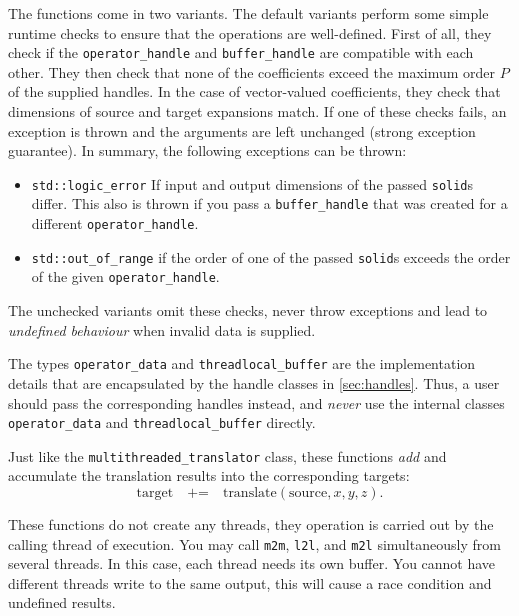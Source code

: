 \documentclass{scrbook}
\begin{document}
The functions come in two variants. The default variants perform some simple
runtime checks to ensure that the operations are well-defined. First of all,
they check if the \lstinline|operator_handle| and \lstinline|buffer_handle| are
compatible with each other. They then check that none of the coefficients
exceed the maximum order $P$ of the supplied handles. In the case of
vector-valued coefficients, they check that dimensions of source and target
expansions match. If one of these checks fails, an exception is thrown and the
arguments are left unchanged (strong exception guarantee). In summary, the
following exceptions can be thrown:
\begin{itemize}
\item \lstinline|std::logic_error| If input and output dimensions of the passed
\lstinline|solid|s differ. This also is thrown if you pass a
\lstinline|buffer_handle| that was created for a different
\lstinline|operator_handle|.
\item \lstinline|std::out_of_range| if the order of one of the passed
\lstinline|solid|s exceeds the order of the given \lstinline|operator_handle|.
\end{itemize}

The unchecked variants omit these checks, never throw exceptions
and lead to \emph{undefined behaviour} when invalid data is supplied.

The types \lstinline|operator_data| and \lstinline|threadlocal_buffer| are the
implementation details that are encapsulated by the handle classes in
\cref{sec:handles}. Thus, a user should pass the corresponding handles instead,
and \emph{never} use the internal classes \lstinline|operator_data| and
\lstinline|threadlocal_buffer| directly.

Just like the \lstinline|multithreaded_translator| class, these functions
\emph{add} and accumulate the translation results into the corresponding
targets:
\begin{equation*}
\textrm{target}\quad\texttt{+=}\quad\textrm{translate}(\textrm{source},x,y,z).
\end{equation*} 

These functions do not create any threads, they operation is carried out by
the calling thread of execution. You may call \lstinline|m2m|, \lstinline|l2l|,
and \lstinline|m2l| simultaneously from several threads. In this case, each
thread needs its own buffer. You cannot have different threads  write to the
same output, this will cause a race condition and undefined results.
\end{document}
